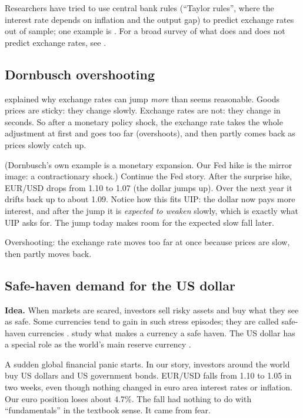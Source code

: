 \documentclass[11pt,a4paper]{article}
\begin{document}
Researchers have tried to use central bank rules (``Taylor rules'', where the
interest rate depends on inflation and the output gap) to predict exchange
rates out of sample; one example is \citet{molodtsovapapell2009}. For a
broad survey of what does and does not predict exchange rates, see
\citet{rossi2013}.

\subsection{Dornbusch overshooting}

\citet{dornbusch1976} explained why exchange rates can jump \emph{more}
than seems reasonable. Goods prices are sticky: they change slowly. Exchange
rates are not: they change in seconds. So after a monetary policy shock,
the exchange rate takes the whole adjustment at first and goes too far
(overshoots), and then partly comes back as prices slowly catch up.

\begin{fictive}
(Dornbusch's own example is a monetary expansion. Our Fed hike is the
mirror image: a contractionary shock.)
Continue the Fed story. After the surprise hike, EUR/USD drops from 1.10 to
1.07 (the dollar jumps up). Over the next year it drifts back up to about
1.09. Notice how this fits UIP: the dollar now pays more interest, and after
the jump it is \emph{expected to weaken} slowly, which is exactly what UIP
asks for. The jump today makes room for the expected slow fall later.
\end{fictive}

\begin{onesentence}
Overshooting: the exchange rate moves too far at once because prices are
slow, then partly moves back.
\end{onesentence}

\subsection{Safe-haven demand for the US dollar}

\textbf{Idea.} When markets are scared, investors sell risky assets and buy
what they see as safe. Some currencies tend to gain in such stress
episodes; they are called safe-haven currencies
\citep{ranaldosoderlind2010}. \citet{habib2012} study what makes a currency
a safe haven. The US dollar has a special role as the world's main reserve
currency \citep{maggiori2017}.

\begin{fictive}
A sudden global financial panic starts. In our story, investors around the
world buy US dollars and US government bonds. EUR/USD falls from 1.10 to
1.05 in two weeks, even though nothing changed in euro area interest rates
or inflation. Our euro position loses about 4.7\%. The fall had nothing to
do with ``fundamentals'' in the textbook sense. It came from fear.
\end{fictive}
\end{document}
